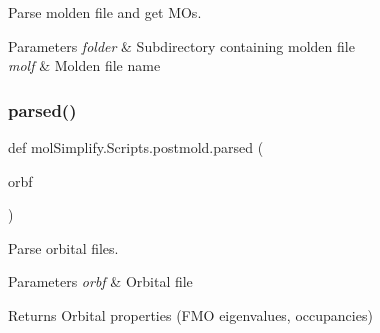 Parse molden file and get M\+Os. 


\begin{DoxyParams}{Parameters}
{\em folder} & Subdirectory containing molden file \\
\hline
{\em molf} & Molden file name \\
\hline
\end{DoxyParams}
\mbox{\label{namespacemolSimplify_1_1Scripts_1_1postmold_a496a961797f3d55b5ed1c3b28dd8b64f}} 
\subsubsection{\texorpdfstring{parsed()}{parsed()}}
{\footnotesize\ttfamily def mol\+Simplify.\+Scripts.\+postmold.\+parsed (\begin{DoxyParamCaption}\item[{}]{orbf }\end{DoxyParamCaption})}



Parse orbital files. 


\begin{DoxyParams}{Parameters}
{\em orbf} & Orbital file \\
\hline
\end{DoxyParams}
\begin{DoxyReturn}{Returns}
Orbital properties (F\+MO eigenvalues, occupancies) 
\end{DoxyReturn}
